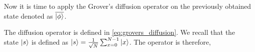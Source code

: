 Now it is time to apply the Grover's diffusion operator on the previously obtained state denoted as $\overline{\ket{\phi}}$.

The diffusion operator is defined in \autoref{eq:grovers_diffusion}. We recall that the state $\ket{s}$ is defined as 
$\ket{s} = \frac{1}{\sqrt{N}}\sum_{x=0}^{N-1} \ket{x}$.
The operator is therefore, 


